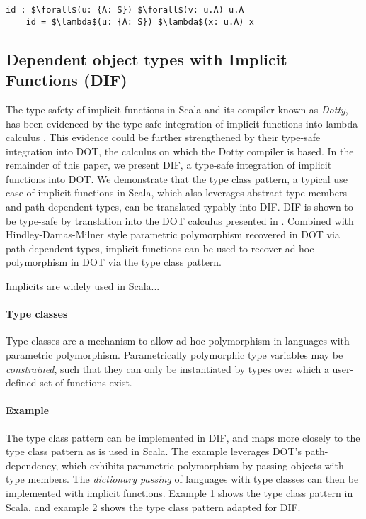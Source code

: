\begin{minipage}{\linewidth}
\begin{lstlisting}[mathescape]
    id : $\forall$(u: {A: S}) $\forall$(v: u.A) u.A
    id = $\lambda$(u: {A: S}) $\lambda$(x: u.A) x
\end{lstlisting}
\end{minipage}

\subsection{Dependent object types with Implicit Functions (DIF)}

The type safety of implicit functions in Scala and its compiler known as
\emph{Dotty}, has been evidenced by the type-safe integration of implicit
functions into lambda calculus \cite{OBLB18}. This evidence could be further
strengthened by their type-safe integration into DOT, the calculus on which the
Dotty compiler is based. In the remainder of this paper, we present DIF, a
type-safe integration of implicit functions into DOT. We demonstrate that the
type class pattern, a typical use case of implicit functions in Scala, which
also leverages abstract type members and path-dependent types, can be translated
typably into DIF. DIF is shown to be type-safe by translation into the DOT
calculus presented in \cite{AGORS16}. Combined with Hindley-Damas-Milner style
parametric polymorphism recovered in DOT via path-dependent types, implicit
functions can be used to recover ad-hoc polymorphism in DOT via the type class
pattern.

Implicits are widely used in Scala... 

\paragraph{Type classes} Type classes \cite{K88, WB89} are a mechanism to allow
ad-hoc polymorphism in languages with parametric polymorphism. Parametrically
polymorphic type variables may be \emph{constrained}, such that they can only be
instantiated by types over which a user-defined set of functions exist.
\TODOTHIS

\paragraph{Example} The type class pattern \cite{OBLB18} can be implemented in
DIF, and maps more closely to the type class pattern as is used in Scala. The
example leverages DOT's path-dependency, which exhibits parametric polymorphism
by passing objects with type members. The \emph{dictionary passing} of languages
with type classes can then be implemented with implicit functions. Example 1
shows the type class pattern in Scala, and example 2 shows the type class
pattern adapted for DIF.

